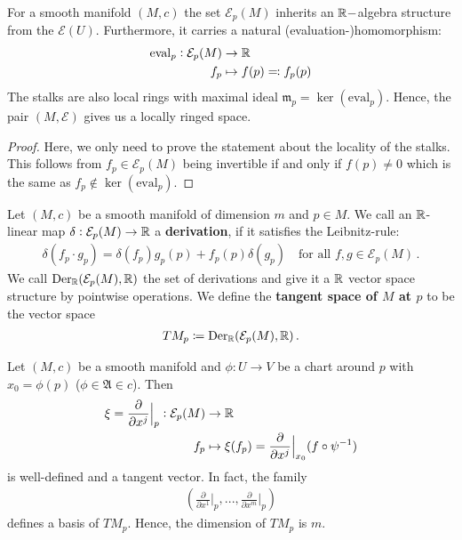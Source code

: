 \begin{corollary}
    For a smooth manifold $(M,c)$ the set $\mathcal{E}_p(M)$ inherits an $\mathbb{R}-$algebra structure from the $\mathcal{E}(U)$. Furthermore, it carries a natural (evaluation-)homomorphism:
    \begin{align*}
       \mathrm{eval}_p: \mathcal{E}_p(M) & \to \mathbb{R} \\
                    f_p  & \mapsto f(p)\eqcolon f_p(p)
    \end{align*}
    The stalks are also local rings with maximal ideal $\mathfrak{m}_p=\ker(\mathrm{eval}_p)$. Hence, the pair $(M,\mathcal{E})$ gives us a locally ringed space.
\end{corollary}
\begin{proof}
    Here, we only need to prove the statement about the locality of the stalks. This follows from $f_p\in \mathcal{E}_p(M)$ being invertible if and only if $f(p)\neq 0$ which is the same as $f_p\notin \ker(\mathrm{eval}_p)$.
\end{proof}
\begin{definition}
    Let $(M,c)$ be a smooth manifold of dimension $m$ and $p\in M$. We call an $\mathbb{R}$-linear map $\delta:\mathcal{E}_p(M)\to \mathbb{R}$ a \textbf{derivation}, if it satisfies the Leibnitz-rule:
    \begin{align*}
        \delta(f_p\cdot g_p)=\delta(f_p)g_p(p)+f_p(p)\delta(g_p) \quad \text{for all }f,g\in \mathcal{E}_p(M) \, .
    \end{align*}
    We call $\mathrm{Der}_{\mathbb{R}}(\mathcal{E}_p(M),\mathbb{R})$ the set of derivations and give it a $\mathbb{R}$ vector space structure by pointwise operations. We define the \textbf{tangent space of $M$ at $p$} to be the vector space
    \begin{align*}
        TM_p \coloneq \mathrm{Der}_{\mathbb{R}}(\mathcal{E}_p(M),\mathbb{R}) \, .
    \end{align*}
\end{definition}
\begin{corollary}
    Let $(M,c)$ be a smooth manifold and $\phi:U\to V$ be a chart around $p$ with $x_0=\phi(p)$ ($\phi \in \mathfrak{A}\in c$). Then 
    \begin{align*}
        \xi=\frac{\partial}{\partial x^j}\Big|_p : \mathcal{E}_p(M) &\to \mathbb{R} \\
        f_p & \mapsto \xi(f_p)=\frac{\partial}{\partial x^j}\Big|_{x_0}(f\circ \psi^{-1} )
    \end{align*} is well-defined and a tangent vector. In fact, the family
    \begin{align*}
        \left(\frac{\partial}{\partial x^1}\Big|_p,...,\frac{\partial}{\partial x^m}\Big|_p\right)
    \end{align*} defines a basis of $TM_p$. Hence, the dimension of $TM_p$ is $m$.
\end{corollary}
